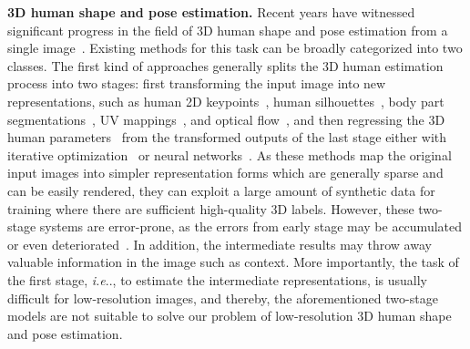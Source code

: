 \documentclass[runningheads]{llncs}
\makeatletter
\DeclareRobustCommand\onedot{\futurelet\@let@token\@onedot}
\def\@onedot{\ifx\@let@token.\else.\null\fi\xspace}
\def\ie{\emph{i.e}\onedot, } \def\Ie{\emph{I.e}\onedot}
\makeatother
\begin{document}
\noindent \textbf{3D human shape and pose estimation.}
Recent years have witnessed significant progress in the field of 3D human shape and pose estimation from a single image~\cite{alldieck2019learning,alldieck2018video,alldieck2019tex2shape,bogo2016keep,doersch2019sim2real,kanazawa2018end,kanazawa2019learning,kocabas2019vibe,kolotouros2019spin,natsume2019siclope,pavlakos2018learning,pumarola20193dpeople,saito2019pifu,zheng2019deephuman,zhang2019predicting,zanfir2018monocular}.
Existing methods for this task can be broadly categorized into two classes.
The first kind of approaches generally splits the 3D human estimation process into two stages: first transforming the input image into new representations, such as human 2D keypoints~\cite{bogo2016keep,pavlakos2018learning,natsume2019siclope,alldieck2018video,alldieck2019learning,doersch2019sim2real}, human silhouettes~\cite{pavlakos2018learning,alldieck2018video,natsume2019siclope}, body part segmentations~\cite{alldieck2019learning}, UV mappings~\cite{alldieck2019tex2shape}, and optical flow~\cite{doersch2019sim2real}, and then regressing the 3D human parameters~\cite{loper2015smpl} from the transformed outputs of the last stage either with iterative optimization~\cite{bogo2016keep,alldieck2018video} or neural networks~\cite{pavlakos2018learning,alldieck2019learning,doersch2019sim2real,natsume2019siclope}.
As these methods map the original input images into simpler representation forms which are generally sparse and can be easily rendered, they can exploit a large amount of synthetic data for training where there are sufficient high-quality 3D labels.
However, these two-stage systems are error-prone, as the errors from early stage may be accumulated or even deteriorated~\cite{kanazawa2018end}. 
In addition, the intermediate results may throw away valuable information in the image such as context.
More importantly, the task of the first stage, \ie to estimate the intermediate representations, is usually difficult for low-resolution images, and thereby, the aforementioned two-stage models are not suitable to solve our problem of low-resolution 3D human shape and pose estimation. 
\end{document}
